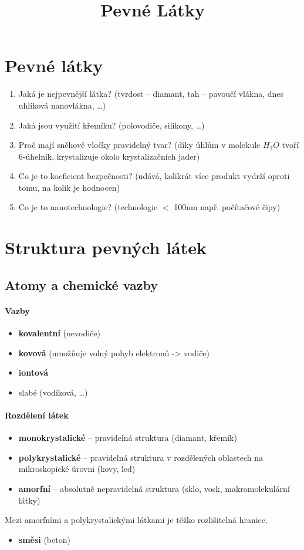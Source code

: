 \title{Pevné Látky}



\section{Pevné látky}
\begin{enumerate}
\item Jaká je nejpevnější látka? (tvrdost -- diamant, tah -- pavoučí vlákna, dnes uhlíková nanovlákna, \ldots)
\item Jaká jsou využití křemíku? (polovodiče, silikony, \ldots)
\item Proč mají sněhové vločky pravidelný tvar? (díky úhlům v molekule $H_2O$ tvoří 6-úhelník, krystalizuje okolo krystalizačních jader)
\item Co je to koeficient bezpečnosti? (udává, kolikrát více produkt vydrží oproti tomu, na kolik je hodnocen)
\item Co je to nanotechnologie? (technologie $<$ 100nm např. počítačové čipy)
\end{enumerate}

\section{Struktura pevných látek}
\subsection{Atomy a chemické vazby}
\paragraph{Vazby}
\begin{itemize}
\item \textbf{kovalentní} (nevodiče)
\item \textbf{kovová} (umožňuje volný pohyb elektronů -> vodiče)
\item \textbf{iontová} 
\item slabé (vodíková, \ldots)
\end{itemize}

\paragraph{Rozdělení látek}
\begin{itemize}
\item \textbf{monokrystalické} -- pravidelná struktura (diamant, křemík)
\item \textbf{polykrystalické} -- pravidelná struktura v rozdělených oblastech na mikroskopické úrovni (kovy, led)
\item \textbf{amorfní} -- absolutně nepravidelná struktura (sklo, vosk, makromolekulární látky)
\end{itemize}
Mezi amorfními a polykrystalickými látkami je těžko rozlišitelná hranice.
\begin{itemize}
\item \textbf{směsi} (beton)
\end{itemize}



